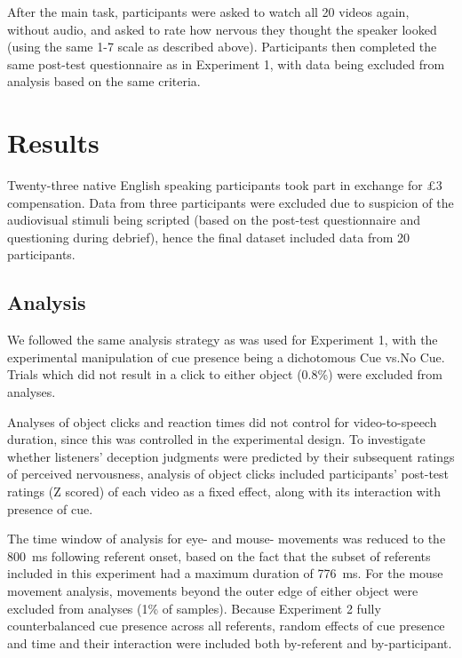 \documentclass[a4paper,man,natbib]{apa6}
\begin{document}
After the main task, participants were asked to watch all 20 videos again, without audio, and asked to rate how nervous they thought the speaker looked (using the same 1-7 scale as described above).
Participants then completed the same post-test questionnaire as in Experiment 1, with data being excluded from analysis based on the same criteria.

\section{Results}
Twenty-three native English speaking participants took part in exchange for \pounds{}3 compensation. 
Data from three participants were excluded due to suspicion of the audiovisual stimuli being scripted (based on the post-test questionnaire and questioning during debrief), hence the final dataset included data from 20 participants.

\subsection{Analysis}
We followed the same analysis strategy as was used for Experiment 1, with the experimental manipulation of cue presence being a dichotomous Cue vs.\@ No Cue.
Trials which did not result in a click to either object (0.8\%) were excluded from analyses.

Analyses of object clicks and reaction times did not control for video-to-speech duration, since this was controlled in the experimental design.
To investigate whether listeners' deception judgments were predicted by their subsequent ratings of perceived nervousness, analysis of object clicks included participants' post-test ratings (Z scored) of each video as a fixed effect, along with its interaction with presence of cue.

The time window of analysis for eye- and mouse- movements was reduced to the 800~ms following referent onset, based on the fact that the subset of referents included in this experiment had a maximum duration of 776~ms. 
For the mouse movement analysis, movements beyond the outer edge of either object were excluded from analyses (1\% of samples).
Because Experiment 2 fully counterbalanced cue presence across all referents, random effects of cue presence and time and their interaction were included both by-referent and by-participant.
\end{document}
